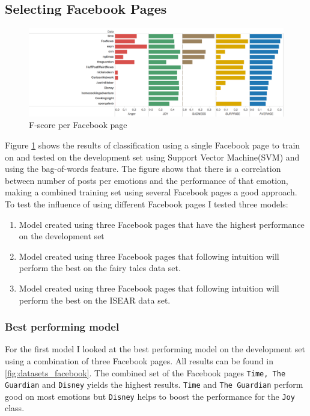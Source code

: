 \documentclass[
10pt, %
a4paper, %
oneside, %
headinclude,footinclude, %
BCOR5mm, %
]{scrartcl}
\begin{document}
\subsection{Selecting Facebook Pages}
\begin{figure}[htb]
  \includegraphics[width=\linewidth]{dataset.png}
  \caption{F-score per Facebook page}
  \label{fig:dataset_facebook}
\end{figure}
Figure \ref{fig:dataset_facebook} shows the results of classification using a single Facebook page to train on and tested on the development set using Support Vector Machine(SVM) and using the bag-of-words feature. The figure shows that there is a correlation between number of posts per emotions and the performance of that emotion, making a combined training set using several Facebook pages a good approach. To test the influence of using different Facebook pages I tested three models: \\
\begin{enumerate}
\item Model created using three Facebook pages that have the highest performance on the development set
\item Model created using three Facebook pages that following intuition will perform the best on the fairy tales data set.
\item Model created using three Facebook pages that following intuition will perform the best on the ISEAR data set.
\end{enumerate}

\subsubsection{Best performing model}
For the first model I looked at the best performing model on the development set using a combination of three Facebook pages. All results can be found in \ref{fig:datasets_facebook}. The combined set of the Facebook pages \texttt{Time, The Guardian} and \texttt{Disney} yields the highest results. \texttt{Time} and \texttt{The Guardian} perform good on most emotions but \texttt{Disney} helps to boost the performance for the \texttt{Joy} class.
\end{document}
